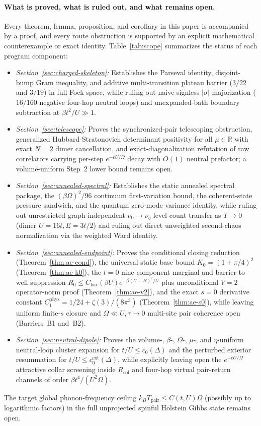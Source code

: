 \documentclass[11pt]{article}
\theoremstyle{definition}
\theoremstyle{remark}
\newcommand{\R}{\mathbb{R}}
\newcommand{\Tpair}{T_{\mathrm{pair}}}
\begin{document}
 \paragraph{What is proved, what is ruled out, and what remains open.}
 Every theorem, lemma, proposition, and corollary in this paper is accompanied
 by a proof, and every route obstruction is supported by an explicit mathematical
counterexample or exact identity. Table~\ref{tab:scope} summarizes the
status of each program component:
\begin{itemize}[leftmargin=1.5em]
\item \emph{Section~\ref{sec:charged-skeleton}:} Establishes the Parseval
identity, disjoint-bump Gram inequality, and additive multi-transition plateau
barrier ($3/22$ and $3/19$) in full Fock space, while ruling out naive signless
$|\sigma|$-majorization ($16/160$ negative four-hop neutral loops) and
unexpanded-bath boundary subtraction at $\beta t^2/U \gg 1$.
\item \emph{Section~\ref{sec:telescope}:} Proves the synchronized-pair
telescoping obstruction, generalized Hubbard-Stratonovich determinant
positivity for all $\mu \in \R$ with exact $N=2$ dimer cancellation, and
exact-diagonalization refutation of raw correlators carrying per-step
$e^{-cU/\Omega}$ decay with $O(1)$ neutral prefactor; a volume-uniform Step~2
lower bound remains open.
\item \emph{Section~\ref{sec:annealed-spectral}:} Establishes the static
annealed spectral package, the $(\beta\Omega)^2/96$ continuum first-variation
bound, the coherent-state pressure sandwich, and the quantum zero-mode variance
identity, while ruling out unrestricted graph-independent $\nu_0 \to \nu_q$
level-count transfer as $T \to 0$ (dimer $U=16t, E=3t/2$) and ruling out
direct unweighted second-chaos normalization via the weighted Ward identity.
\item \emph{Section~\ref{sec:annealed-endpoint}:} Proves the conditional
closing reduction (Theorem~\ref{thm:ae-cond}), the universal static base
bound $K_0 = (1+\pi/4)^2$ (Theorem~\ref{thm:ae-k0}), the $t=0$ nine-component
marginal and barrier-to-well suppression $R_0 \le C_{\mathrm{bar}}(\beta U) e^{-\beta(U-B)^2/U}$
plus unconditional $V=2$ operator-norm proof (Theorem~\ref{thm:ae-v2}), and
the exact $s=0$ derivative constant $C_1^{\mathrm{phys}} = 1/24 + \zeta(3)/(8\pi^3)$
(Theorem~\ref{thm:ae-s0}), while leaving uniform finite-$s$ closure and
$\Omega \ll U, \tau \to 0$ multi-site pair coherence open (Barriers~B1 and~B2).
\item \emph{Section~\ref{sec:neutral-dipole}:} Proves the volume-, $\beta$-,
$\Omega$-, $\mu$-, and $\eta$-uniform neutral-loop cluster expansion for
$t/U \le c_0(\Delta)$ and the perturbed exterior resummation for
$t/U \le c_0^{\mathrm{ext}}(\Delta)$, while explicitly leaving open the
$e^{+c U/\Omega}$ attractive collar screening inside $R_{\mathrm{col}}$ and
four-hop virtual pair-return channels of order $\beta t^4/(U^2\Omega)$.
\end{itemize}
The target global phonon-frequency ceiling $k_B \Tpair \le C(t,U)\Omega$
(possibly up to logarithmic factors) in the full unprojected spinful Holstein
Gibbs state remains open.
\end{document}
